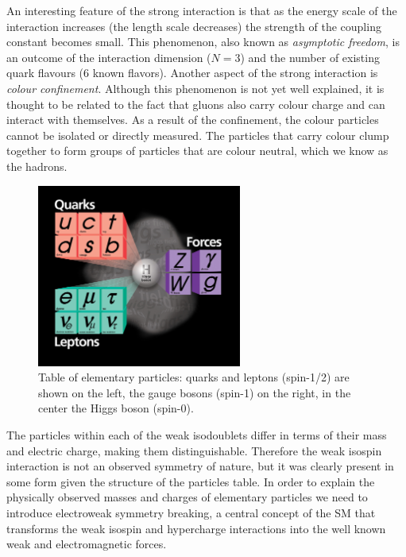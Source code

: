 An interesting feature of the strong interaction is that as the energy scale of the interaction 
increases (the length scale decreases) the strength of the coupling constant becomes small.
This phenomenon,
 also known as {\it asymptotic freedom},
 is an outcome of the interaction dimension ($N=3$) and the number of existing
quark flavours ($6$ known flavors).
 Another aspect of the strong interaction is {\it colour
confinement}. Although this phenomenon is not yet well explained, it is thought to be
 related to the fact that gluons also carry colour charge and can interact
with themselves. As a result of the confinement, the colour particles 
cannot be isolated or directly measured. The particles that carry colour
 clump together to form groups of particles that are colour neutral, which we know as the hadrons.

\begin{figure}
\centering
\includegraphics[width=0.6\textwidth]{plots/intro/Higgs_SM.jpeg}
\caption{Table of elementary particles: quarks and leptons (spin-1/2) are shown on the left,
the gauge bosons (spin-1) on the right, in the center the Higgs boson (spin-0).
\label{fig:parttable}}

\end{figure}

The particles within each of the weak isodoublets differ in terms of their
mass and electric charge, making them distinguishable.
 Therefore the weak isospin interaction is
 not an observed symmetry of nature, but it was clearly present
in some form given the structure of the particles table. 
In order to explain the physically observed masses and charges of elementary
 particles we need to introduce electroweak symmetry breaking, a central concept
of the SM that transforms the
weak isospin and hypercharge interactions into the well known weak and electromagnetic forces.



